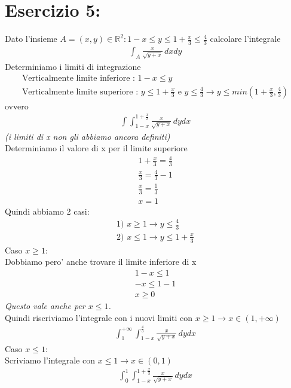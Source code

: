 \documentclass{article}
\begin{document}
\pagebreak
\section*{Esercizio 5:}
Dato l'insieme $A={(x,y)\in\mathbb{R}^2 : 1-x\leq y\leq 1+\frac{x}{3}\leq \frac{4}{3}}$ calcolare l'integrale
\begin{align*}
    \int_A \frac{x}{\sqrt{y+x}} \,dxdy
\end{align*}
Determiniamo i limiti di integrazione
\begin{align*}
    \text{Verticalmente limite inferiore : } 1-x\leq y \\
    \text{Verticalmente limite superiore : } y\leq 1+\frac{x}{3} \text{ e } y \leq \frac{4}{3} \to y \leq min(1+\frac{x}{3},\frac{4}{3})
\end{align*}
ovvero 
\begin{align*}
    \int \int_{1-x}^{1+\frac{x}{3}} \frac{x}{\sqrt{y+x}} \,dydx
\end{align*}
\textit{(i limiti di x non gli abbiamo ancora definiti)} \\
Determiniamo il valore di x per il limite superiore
\begin{align*}
    1+\frac{x}{3}=\frac{4}{3} \\
    \frac{x}{3}=\frac{4}{3}-1 \\
    \frac{x}{3}=\frac{1}{3} \\
    x=1
\end{align*}
Quindi abbiamo 2 casi:
\begin{align*}
    \text{1) } x \geq 1 \to y\leq\frac{4}{3} \\
    \text{2) } x \leq 1 \to y\leq 1+\frac{x}{3}
\end{align*}
Caso $x\geq 1$: \\
Dobbiamo pero' anche trovare il limite inferiore di x
\begin{align*}
    1-x\leq 1 \\
    -x\leq 1-1 \\
    x\geq 0
\end{align*}
\textit{Questo vale anche per $x\leq 1$.} \\
Quindi riscriviamo l'integrale con i nuovi limiti con $x\geq1 \to x\in (1,+\infty)$
\begin{align*}
    \int_1^{+\infty} \int_{1-x}^{\frac{4}{3}} \frac{x}{\sqrt{y+x}} \,dydx
\end{align*}
Caso $x\leq 1$: \\
Scriviamo l'integrale con $x\leq 1 \to x \in (0,1)$
\begin{align*}
    \int_0^{1} \int_{1-x}^{1+\frac{x}{3}} \frac{x}{\sqrt{y+x}} \,dydx
\end{align*}
\end{document}
